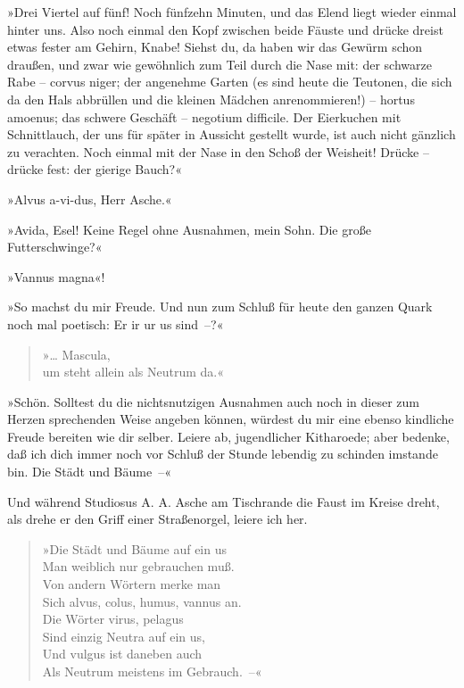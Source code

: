 »Drei Viertel auf fünf! Noch fünfzehn Minuten, und das Elend liegt
wieder einmal hinter uns. Also noch einmal den Kopf zwischen beide
Fäuste und drücke dreist etwas fester am Gehirn, Knabe! Siehst du,
da haben wir das Gewürm schon draußen, und zwar wie gewöhnlich zum
Teil durch die Nase mit: der schwarze Rabe – corvus niger; der
angenehme Garten (es sind heute die Teutonen, die sich da den Hals
abbrüllen und die kleinen Mädchen anrenommieren!) – hortus amoenus;
das schwere Geschäft – negotium difficile. Der Eierkuchen mit
Schnittlauch, der uns für später in Aussicht gestellt wurde, ist
auch nicht gänzlich zu verachten. Noch einmal mit der Nase in den
Schoß der Weisheit! Drücke – drücke fest: der gierige Bauch?«

»Alvus a-vi-dus, Herr Asche.«

»Avida, Esel! Keine Regel ohne Ausnahmen, mein Sohn. Die große
Futterschwinge?«

»Vannus magna«!

»So machst du mir Freude. Und nun zum Schluß für heute den ganzen
Quark noch mal poetisch: Er ir ur us sind~–?«

\begin{verse}
»\ldots{} Mascula,\\
um steht allein als Neutrum da.«
\end{verse}

»Schön. Solltest du die nichtsnutzigen Ausnahmen auch noch in
dieser zum Herzen sprechenden Weise angeben können, würdest du mir
eine ebenso kindliche Freude bereiten wie dir selber. Leiere ab,
jugendlicher Kitharoede; aber bedenke, daß ich dich immer noch vor
Schluß der Stunde lebendig zu schinden imstande bin. Die Städt und
Bäume~–«

Und während Studiosus A. A. Asche am Tischrande die Faust im Kreise
dreht, als drehe er den Griff einer Straßenorgel, leiere ich her.

\begin{verse}
»Die Städt und Bäume auf ein us\\
Man weiblich nur gebrauchen muß.\\
Von andern Wörtern merke man\\
Sich alvus, colus, humus, vannus an.\\
Die Wörter virus, pelagus\\
Sind einzig Neutra auf ein us,\\
Und vulgus ist daneben auch\\
Als Neutrum meistens im Gebrauch.~–«
\end{verse}

